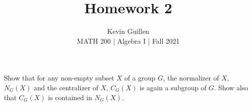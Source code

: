 \documentclass[10pt]{article}
\newenvironment{problem}[2][Problem\!]{\begin{trivlist}
\item[\hskip \labelsep {\bfseries #1}\hskip \labelsep {\bfseries #2.}]}{\end{trivlist}}
\begin{document}
 
\title{Homework 2}
\author{Kevin Guillen\\[0.5cm]
MATH 200 | Algebra I | Fall 2021}
\date{} 
\maketitle

\begin{tcolorbox}
    \begin{problem}{2.6}
        Show that for any non-empty subset $X$ of a group $G$, the normalizer of $X$, $N_G(X)$ and the centralizer of $X$, $C_G(X)$ is again a subgroup of $G$. Show also that $C_G(X)$ is contained in $N_G(X)$.
    \end{problem}
\end{tcolorbox}
\end{document}
